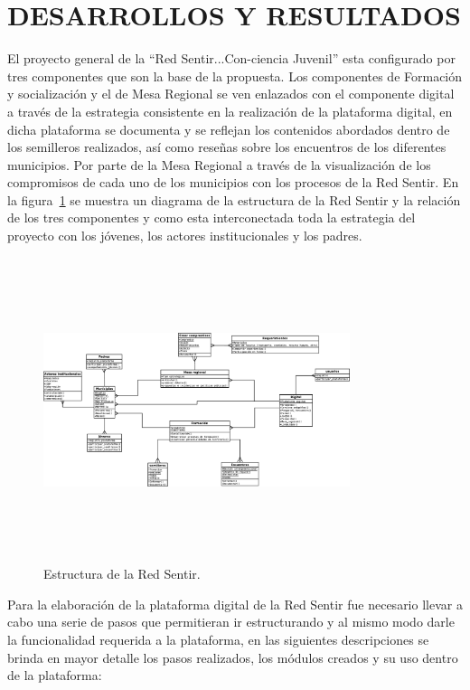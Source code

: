 \documentclass[a4paper]{article}
\begin{document}
\section{DESARROLLOS Y RESULTADOS}\label{sec:resultados}

El proyecto general de la ``Red Sentir...Con-ciencia Juvenil'' esta configurado por tres componentes que son la base de la propuesta. Los componentes de Formación y socialización y el de Mesa Regional se ven enlazados con el componente digital a través de la estrategia consistente en la realización de la plataforma digital, en dicha plataforma se documenta y se reflejan los contenidos abordados dentro de los semilleros realizados, así como reseñas sobre los encuentros de los diferentes municipios. Por parte de la Mesa Regional a través de la visualización de los compromisos de cada uno de los municipios con los procesos de la Red Sentir. En la figura~\ref{fig:red} se muestra un diagrama de la estructura de la Red Sentir y la relación de los tres componentes y como esta interconectada toda la estrategia del proyecto con los jóvenes, los actores institucionales y los padres. 

\begin{figure}[t]
\centering
\includegraphics[width=0.8\textwidth,height=3.5in]{red.eps}
\caption{Estructura de la Red Sentir.}
\label{fig:red}
\end{figure}

Para la elaboración de la plataforma digital de la Red Sentir fue necesario llevar a cabo una serie de pasos que permitieran ir estructurando y al mismo modo darle la funcionalidad requerida a la plataforma, en las siguientes descripciones se brinda en mayor detalle los pasos realizados, los módulos creados y su uso dentro de la plataforma:
\end{document}
